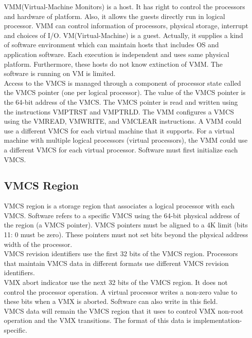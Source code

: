 \documentclass[10pt,draftclsnofoot,peerreview ,letterpaper,onecolumn,]{IEEEtran}
\begin{document}
	VMM(Virtual-Machine Monitors) is a host. It has right to control the processors and hardware of platform. Also, it allows the guests directly run in logical processor. VMM can control information of processors, physical storage, interrupt and choices of I/O. VM(Virtual-Machine) is a guest. Actually, it supplies a kind of software environment which can maintain hosts that includes OS and application software. Each execution is independent and uses same physical platform. Furthermore, these hosts do not know extinction of VMM. The software is running on VM is limited.\\
	
    Access to the VMCS is managed through a component of processor state called the VMCS pointer (one per logical processor). The value of the VMCS pointer is the 64-bit address of the VMCS. The VMCS pointer is read and written using the instructions VMPTRST and VMPTRLD. The VMM configures a VMCS using the VMREAD, VMWRITE, and VMCLEAR instructions. A VMM could use a different VMCS for each virtual machine that it supports. For a virtual machine with multiple logical processors (virtual processors), the VMM could use a different VMCS for each virtual processor. Software must first initialize each VMCS.\\
	
	
	\subsection{VMCS Region}
	VMCS region is a storage region that associates a logical processor with each VMCS. Software refers to a specific VMCS using the 64-bit physical address of the region (a VMCS pointer). VMCS pointers must be aligned to a 4K limit (bits 11: 0 must be zero). These pointers must not set bits beyond the physical address width of the processor.\\
	VMCS revision identifiers use the first 32 bits of the VMCS region. Processors that maintain VMCS data in different formats use different VMCS revision identifiers.\\
	VMX abort indicator use the next 32 bits of the VMCS region. It does not control the processor operation. A virtual processor writes a non-zero value to these bits when a VMX is aborted. Software can also write in this field.\\
	VMCS data will remain the VMCS region that it uses to control VMX non-root operation and the VMX transitions. The format of this data is implementation-specific.\\
	
\end{document}
